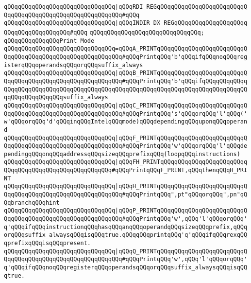 \verb|qQQqqQQqqQQqqQQqqQQqqQQqqQQqqQQq|\verb#|qQQqRDI_REGqQQqqQQqqQQqqQQqqQQqqQQqqQQqqQQqqQQqqQQqqQQqqQQqqQQqqQQqqQQq#\verb|#qQQq|\newline
\verb|qQQqqQQqqQQqqQQqqQQqqQQqqQQqqQQq|\verb#|qQQqINDIR_DX_REGqQQqqQQqqQQqqQQqqQQqqQQqqQQqqQQqqQQqqQQq#\verb|#qQQq|\newline
\verb|qQQqqQQqqQQqqQQqqQQqqQQqqQQqqQQq;|\newline
\newline
\verb|qQQqqQQqqQQqqQQqPrint_Mode|\newline
\verb|qQQqqQQqqQQqqQQqqQQqqQQqqQQqqQQq=qQQqA_PRINTqQQqqQQqqQQqqQQqqQQqqQQqqQQqqQQqqQQqqQQqqQQqqQQqqQQqqQQqqQQq#qQQqPrintqQQq'b'qQQqifqQQqnoqQQqregisterqQQqoperandsqQQqorqQQqsuffix_always|\newline
\verb|qQQqqQQqqQQqqQQqqQQqqQQqqQQqqQQq|\verb#|qQQqB_PRINTqQQqqQQqqQQqqQQqqQQqqQQqqQQqqQQqqQQqqQQqqQQqqQQqqQQqqQQqqQQq#\verb|#qQQqPrintqQQq'b'qQQqifqQQqqQQqqQQqqQQqqQQqqQQqqQQqqQQqqQQqqQQqqQQqqQQqqQQqqQQqqQQqqQQqqQQqqQQqqQQqqQQqqQQqqQQqqQQqqQQqqQQqsuffix_always|\newline
\verb|qQQqqQQqqQQqqQQqqQQqqQQqqQQqqQQq|\verb#|qQQqC_PRINTqQQqqQQqqQQqqQQqqQQqqQQqqQQqqQQqqQQqqQQqqQQqqQQqqQQqqQQqqQQq#\verb|#qQQqPrintqQQq's'qQQqorqQQq'l'qQQq('w'qQQqorqQQq'd'qQQqinqQQqIntelqQQqmode)qQQqdependingqQQquponqQQqoperand|\newline
\verb|qQQqqQQqqQQqqQQqqQQqqQQqqQQqqQQq|\verb#|qQQqF_PRINTqQQqqQQqqQQqqQQqqQQqqQQqqQQqqQQqqQQqqQQqqQQqqQQqqQQqqQQqqQQq#\verb|#qQQqPrintqQQq'w'qQQqorqQQq'l'qQQqdependingqQQqonqQQqaddressqQQqsizeqQQqprefixqQQq(loopqQQqinstructions)|\newline
\verb|qQQqqQQqqQQqqQQqqQQqqQQqqQQqqQQq|\verb#|qQQqFH_PRINTqQQqqQQqqQQqqQQqqQQqqQQqqQQqqQQqqQQqqQQqqQQqqQQqqQQqqQQq#\verb|#qQQqPrintqQQqF_PRINT,qQQqthenqQQqH_PRINT|\newline
\verb|qQQqqQQqqQQqqQQqqQQqqQQqqQQqqQQq|\verb#|qQQqH_PRINTqQQqqQQqqQQqqQQqqQQqqQQqqQQqqQQqqQQqqQQqqQQqqQQqqQQqqQQqqQQq#\verb|#qQQqPrintqQQq",pt"qQQqorqQQq",pn"qQQqbranchqQQqhint|\newline
\verb|qQQqqQQqqQQqqQQqqQQqqQQqqQQqqQQq|\verb#|qQQqP_PRINTqQQqqQQqqQQqqQQqqQQqqQQqqQQqqQQqqQQqqQQqqQQqqQQqqQQqqQQqqQQq#\verb|#qQQqPrintqQQq'w',qQQq'l'qQQqorqQQq'q'qQQqifqQQqinstructionqQQqhasqQQqanqQQqoperandqQQqsizeqQQqprefix,qQQqorqQQqsuffix_alwaysqQQqisqQQqtrue.qQQqqQQqprintqQQq'q'qQQqifqQQqrexqQQqprefixqQQqisqQQqpresent.|\newline
\verb|qQQqqQQqqQQqqQQqqQQqqQQqqQQqqQQq|\verb#|qQQqQ_PRINTqQQqqQQqqQQqqQQqqQQqqQQqqQQqqQQqqQQqqQQqqQQqqQQqqQQqqQQqqQQq#\verb|#qQQqPrintqQQq'w',qQQq'l'qQQqorqQQq'q'qQQqifqQQqnoqQQqregisterqQQqoperandsqQQqorqQQqsuffix_alwaysqQQqisqQQqtrue.|\newline
